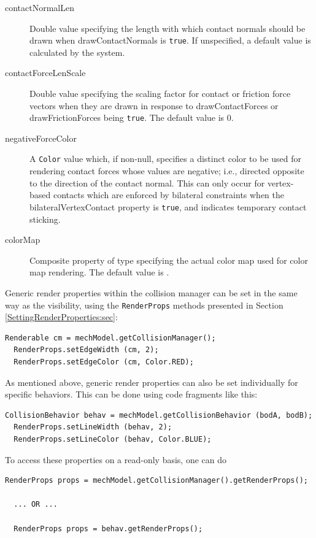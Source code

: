 \begin{description}

\item[contactNormalLen]\mbox{}

Double value specifying the length with which contact normals should
be drawn when {\sf drawContactNormals} is {\tt true}. If unspecified,
a default value is calculated by the system.

\item[contactForceLenScale]\mbox{}

Double value specifying the scaling factor for contact or friction
force vectors when they are drawn in response to {\sf
drawContactForces} or {\sf drawFrictionForces} being {\tt true}.  The
default value is 0.

\item[negativeForceColor]\mbox{}

A {\tt Color} value which, if non-null, specifies a distinct color to be used
for rendering contact forces whose values are negative; i.e., directed opposite
to the direction of the contact normal. This can only occur for vertex-based
contacts which are enforced by bilateral constraints when the {\sf
bilateralVertexContact} property is {\tt true}, and indicates temporary
contact sticking.

\item[colorMap]\mbox{}

Composite property of type 
specifying the actual color map used for color map rendering.
The default value is 
.

\end{description}


Generic render properties within the collision manager can be
set in the same way as the visibility, using the {\tt RenderProps}
methods presented in Section \ref{SettingRenderProperties:sec}:
\begin{lstlisting}[]
  Renderable cm = mechModel.getCollisionManager();
  RenderProps.setEdgeWidth (cm, 2);
  RenderProps.setEdgeColor (cm, Color.RED);
\end{lstlisting}

As mentioned above, generic render properties can also be set
individually for specific behaviors. This can be done using code
fragments like this:
\begin{lstlisting}[]
  CollisionBehavior behav = mechModel.getCollisionBehavior (bodA, bodB);
  RenderProps.setLineWidth (behav, 2);
  RenderProps.setLineColor (behav, Color.BLUE);
\end{lstlisting}
To access these properties on a read-only basis, one can do
\begin{lstlisting}[]
  RenderProps props = mechModel.getCollisionManager().getRenderProps();

  ... OR ...

  RenderProps props = behav.getRenderProps();
\end{lstlisting}

